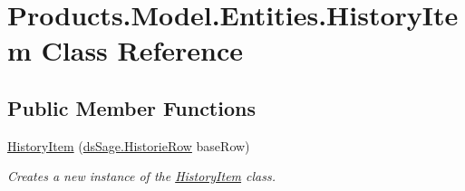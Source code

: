 \hypertarget{class_products_1_1_model_1_1_entities_1_1_history_item}{}\section{Products.\+Model.\+Entities.\+History\+Item Class Reference}
\label{class_products_1_1_model_1_1_entities_1_1_history_item}
\subsection*{Public Member Functions}
\begin{DoxyCompactItemize}
\item 
\hyperlink{class_products_1_1_model_1_1_entities_1_1_history_item_a61b5c4faeb2bbe463bd559a74b3432ba}{History\+Item} (\hyperlink{class_products_1_1_data_1_1ds_sage_1_1_historie_row}{ds\+Sage.\+Historie\+Row} base\+Row)
\begin{DoxyCompactList}\small\item\em Creates a new instance of the \hyperlink{class_products_1_1_model_1_1_entities_1_1_history_item}{History\+Item} class. \end{DoxyCompactList}\end{DoxyCompactItemize}

